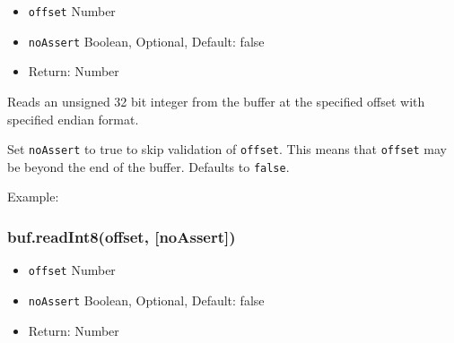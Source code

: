 \begin{itemize}
\itemsep1pt\parskip0pt
\item
  \texttt{offset} Number
\item
  \texttt{noAssert} Boolean, Optional, Default: false
\item
  Return: Number
\end{itemize}

Reads an unsigned 32 bit integer from the buffer at the specified offset
with specified endian format.

Set \texttt{noAssert} to true to skip validation of \texttt{offset}.
This means that \texttt{offset} may be beyond the end of the buffer.
Defaults to \texttt{false}.

Example:

\begin{Shaded}
\begin{Highlighting}[]
  \NormalTok{(}\NormalTok{);}

\NormalTok{buf[}\NormalTok{] = }\NormalTok{;}
\NormalTok{buf[}\NormalTok{] = }\NormalTok{;}
\NormalTok{buf[}\NormalTok{] = }\NormalTok{;}
\NormalTok{buf[}\NormalTok{] = }\NormalTok{;}

\NormalTok{(}\NormalTok{(}\NormalTok{));}
\NormalTok{(}\NormalTok{(}\NormalTok{));}

\end{Highlighting}
\end{Shaded}

\subsubsection{buf.readInt8(offset,
{[}noAssert{]})}\label{buf.readint8offset-noassert}

\begin{itemize}
\itemsep1pt\parskip0pt
\item
  \texttt{offset} Number
\item
  \texttt{noAssert} Boolean, Optional, Default: false
\item
  Return: Number
\end{itemize}

